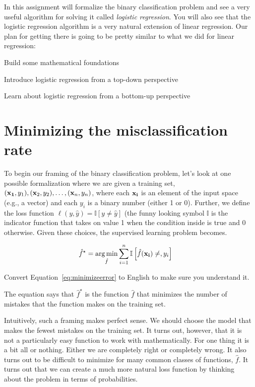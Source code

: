 \documentclass[assignment03_Solutions]{subfiles}
\begin{document}
In this assignment will formalize the binary classification problem and see a very useful algorithm for solving it called \emph{logistic regression}.  You will also see that the logistic regression algorithm is a very natural extension of linear regression.  Our plan for getting there is going to be pretty similar to what we did for linear regression:
\bi
\item Build some mathematical foundations
\item Introduce logistic regression from a top-down perspective
\item Learn about logistic regression from a bottom-up perspective
\ei

\section{Minimizing the misclassification rate}
To begin our framing of the binary classification problem, let's look at one possible formalization where we are given a training set, $(\mathbf{x_1}, y_1), (\mathbf{x}_2, y_2), \ldots, (\mathbf{x}_n, y_n)$, where each $\mathbf{x_i}$ is an element of the input space (e.g., a vector) and each $y_i$ is a binary number (either 1 or 0).  Further, we define the loss function $\ell(y, \hat{y}) = \mathbb{I}[y \neq \hat{y}]$ (the funny looking symbol $\mathbb{I}$ is the indicator function that takes on value 1 when the condition inside is true and 0 otherwise.  Given these choices, the supervised learning problem becomes.

\begin{align}
\hat{f}^\star &= \operatorname*{arg\,min}_{\hat{f}} \sum_{i=1}^n \mathbb{I} \left [  \hat{f}(\mathbf{x_i}) \neq, y_i\right ] \label{eq:minimizeerror}
\end{align}

\begin{exercise}
Convert Equation~\ref{eq:minimizeerror} to English to make sure you understand it.
\begin{boxedsolution}
The equation says that $\hat{f}^\star$ is the function $\hat{f}$ that minimizes the number of mistakes that the function makes on the training set.
\end{boxedsolution}
\end{exercise}

Intuitively, such a framing makes perfect sense.  We should choose the model that makes the fewest mistakes on the training set.  It turns out, however, that it is not a particularly easy function to work with mathematically.  For one thing it is a bit all or nothing.  Either we are completely right or completely wrong.  It also turns out to be difficult to minimize for many common classes of functions, $\hat{f}$.  It turns out that we can create a much more natural loss function by thinking about the problem in terms of probabilities.
\end{document}
